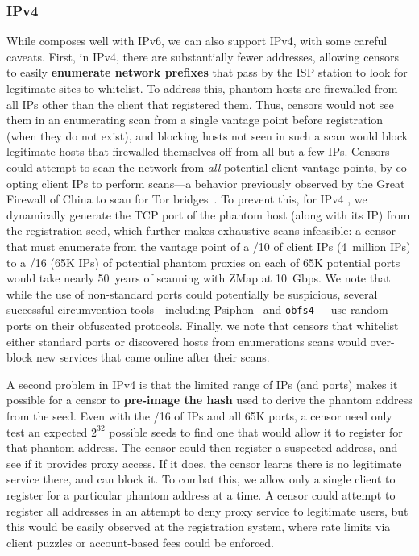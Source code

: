 \documentclass[sigconf,anonymous]{acmart}
\begin{document}

\subsubsection{IPv4}
While \scheme composes well with IPv6, we can also support IPv4, with some
careful caveats. First, in IPv4, there are substantially fewer addresses,
allowing censors to easily \textbf{enumerate network prefixes} that pass by the ISP
station to look for legitimate sites to whitelist. To address this, \scheme
phantom hosts are firewalled from all IPs other than the client that registered
them. Thus, censors would not see them in an enumerating scan from a single
vantage point before registration (when they do not exist), and blocking hosts
not seen in such a scan would block legitimate hosts that firewalled themselves
off from all but a few IPs. %
Censors could attempt to scan the network from \emph{all} potential client
vantage points, by co-opting client IPs to perform scans---a behavior previously
observed by the Great Firewall of China to scan for Tor bridges~\cite{ensafi-tor}.
To prevent this, for IPv4 \scheme, we dynamically generate the TCP port of the
phantom host (along with its IP) from the registration seed, which further makes
exhaustive scans infeasible:
a censor that must enumerate from the vantage point of a /10 of client IPs (4~million IPs)
to a /16 (65K IPs) of potential phantom proxies on each of 65K potential ports would take nearly
50~years of scanning with ZMap at 10~Gbps. We note that while the use of
non-standard ports could potentially be suspicious, several successful
circumvention tools---including Psiphon~\cite{psiphon} and
\texttt{obfs4}~\cite{obfs4}---use random ports on their obfuscated protocols.
Finally, we note that censors that whitelist either standard ports or discovered
hosts from enumerations scans would over-block new services that came online after
their scans.

A second problem in IPv4 \scheme is that the limited range of IPs (and ports)
makes it possible for a censor to \textbf{pre-image the hash} used to derive the phantom
address from the seed. Even with the /16 of IPs and all 65K ports, a censor need
only test an expected $2^{32}$ possible seeds to find one that would allow it
to register for that phantom address. The censor could then register a suspected
address, and see if it provides proxy access. If it does, the censor learns
there is no legitimate service there, and can block it. To combat this, we
allow only a single client to register for a particular phantom address at a
time. A censor could attempt to register all addresses in an attempt to deny
proxy service to legitimate users, but this would be easily observed at the
registration system, where rate limits via client puzzles or account-based fees
could be enforced.
\end{document}
